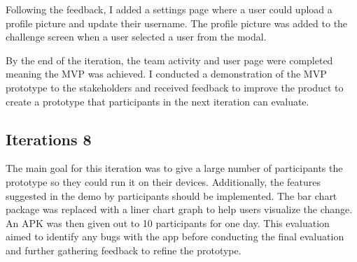 \documentclass{l4proj}
\begin{document}
Following the feedback, I added a settings page where a user could upload a profile picture and update their username. The profile picture was added to the challenge screen when a user selected a user from the modal. 

By the end of the iteration, the team activity and user page were completed meaning the MVP was achieved. I conducted a demonstration of the MVP prototype to the stakeholders and received feedback to improve the product to create a prototype that participants in the next iteration can evaluate. 


\subsection{Iterations 8}
The main goal for this iteration was to give a large number of participants the prototype so they could run it on their devices. Additionally, the features suggested in the demo by participants should be implemented.  
The bar chart package was replaced with a liner chart graph to help users visualize the change. An APK was then given out to 10 participants for one day. This evaluation aimed to identify any bugs with the app before conducting the final evaluation and further gathering feedback to refine the prototype. 
\end{document}

